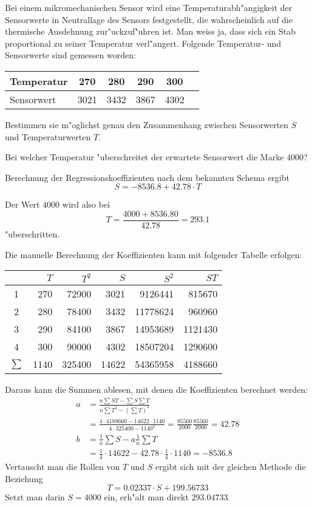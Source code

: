 Bei einem mikromechanischen Sensor wird eine Temperaturabh"angigkeit
der Sensorwerte in Neutrallage des Sensors festgestellt,
die wahrscheinlich auf die thermische
Ausdehnung zur"uckzuf"uhren ist. Man weiss ja, dass sich
ein Stab proportional zu seiner Temperatur verl"angert. Folgende
Temperatur- und Sensorwerte sind gemessen worden:
\begin{center}
\begin{tabular}{l|c|c|c|c|c}
Temperatur&270&280&290&300\\
\hline
Sensorwert&3021&3432&3867&4302\\
\end{tabular}
\end{center}
\begin{teilaufgaben}
\item Bestimmen sie m"oglichst genau den Zusammenhang zwischen
Sensorwerten $S$ und Temperaturwerten $T$.
\item Bei welcher Temperatur "uberschreitet der erwartete Sensorwert
die Marke $4000$?
\end{teilaufgaben}

\begin{loesung}
\begin{teilaufgaben}
\item Berechnung der Regressionskoeffizienten nach dem bekannten
Schema ergibt
\[
S=-8536.8 + 42.78\cdot T
\]
\item
Der Wert $4000$ wird also bei
\[
T=\frac{4000 + 8536.80}{42.78}=293.1
\]
"uberschritten.
\end{teilaufgaben}
Die manuelle Berechnung der Koeffizienten kann mit folgender Tabelle
erfolgen:
\begin{center}
\begin{tabular}{|c|r|r|r|r|r|}
\hline
&$T$&$T^2$&$S$&$S^2$&$ST$\\
\hline
1&270&72900& 3021& 9126441& 815670\\
2&280&78400& 3432& 11778624& 960960\\
3&290&84100& 3867& 14953689& 1121430\\
4&300&90000& 4302& 18507204& 1290600\\
\hline
$\sum$&1140& 325400& 14622& 54365958& 4188660\\
\hline
\end{tabular}
\end{center}
Daraus kann die Summen ablesen, mit denen die Koeffizienten berechnet
werden:
\begin{align*}
a&=\frac{n\sum ST-\sum S\sum T}{n\sum T^2-(\sum T)^2}
\\
&=
\frac{
4\cdot 4188660 - 14622\cdot 1140
}{
4\cdot 325400 - 1140^2
}
=
\frac{
85560
}{
2000
}
\frac{85560}{2000}
=42.78
\\
b&=\textstyle \frac1n\sum S-a\frac1n\sum T
\\
&=
\frac14\cdot 14622-42.78\cdot\frac14\cdot 1140
=-8536.8
\end{align*}
Vertauscht man die Rollen von $T$ und $S$ ergibt sich mit der
gleichen Methode die Beziehung
\[
T=0.02337\cdot S +199.56733
\]
Setzt man darin $S=4000$ ein, erh"alt man direkt
$293.04733$.
\end{loesung}

